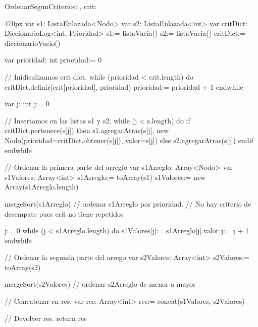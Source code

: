 \documentclass[10pt,a4paper]{article}
\begin{document}
\newpage
{}


\begin{proc}{OrdenarSegunCriterio}{\In s: , \In crit: }{}
  \begin{ImplementationCode}{470px}
    var s1: ListaEnlazada<Nodo>
    var s2: ListaEnlazada<int>
    var critDict: DiccionarioLog<int, Prioridad>
        s1:= listaVacia()
        s2:= listaVacia()
        critDict:= diccionarioVacio()
    
    var prioridad: int
        prioridad:= 0
    
    // Inidicalizamos crit dict.
    while (prioridad < crit.length) do
      critDict.definir(crit[prioridad], prioridad)
      prioridad:= prioridad + 1
    endwhile
  
    var j: int
        j:= 0
    
    // Insertamos en las listas s1 y s2.
    while (j < s.length) do
      if critDict.pertenece(s[j]) then
        s1.agregarAtras(s[j], new Nodo(prioridad=critDict.obtener(s[j]), valor=s[j])
      else
        s2.agregarAtras(s[j])
      endif
    endwhile
  
    // Ordenar la primera parte del arreglo
    var s1Arreglo: Array<Nodo>
    var s1Valores: Array<int>
        s1Arreglo:= toArray(s1)
        s1Valores:= new Array(s1Arreglo.length)
  
    mergeSort(s1Arreglo) // ordenar s1Arreglo por prioridad.
    // No hay criterio de desempate pues crit no tiene repetidos
  
    j:= 0
    while (j < s1Arreglo.length) do
      s1Valores[j]:= s1Arreglo[j].valor
      j:= j + 1
    endwhile 
  
    // Ordenar la segunda parte del arrego
    var s2Valores: Array<int>
        s2Valores:= toArray(s2)
  
    mergeSort(s2Valores) // ordenar s2Arreglo de menor a mayor
  
    // Concatenar en res.
    var res: Array<int>
        res:= concat(s1Valores, s2Valores)
  
    // Devolver res.
    return res
  \end{ImplementationCode}
\end{proc}
\end{document}
